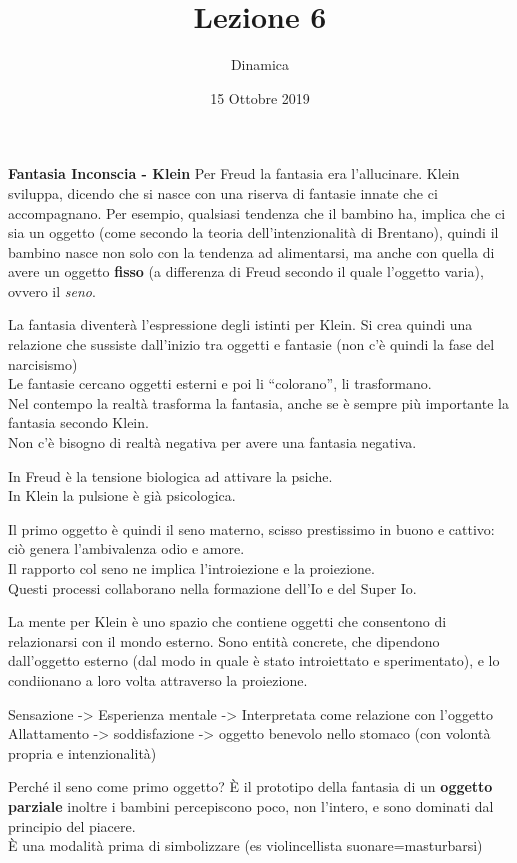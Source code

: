 \documentclass[
]{article}
\date{15 Ottobre 2019}
\title{Lezione 6}
\author{Dinamica}
\begin{document}
\maketitle

\textbf{Fantasia Inconscia - Klein} Per Freud la fantasia era
l'allucinare. Klein sviluppa, dicendo che si nasce con una riserva di
fantasie innate che ci accompagnano. Per esempio, qualsiasi tendenza che
il bambino ha, implica che ci sia un oggetto (come secondo la teoria
dell'intenzionalità di Brentano), quindi il bambino nasce non solo con
la tendenza ad alimentarsi, ma anche con quella di avere un oggetto
\textbf{fisso} (a differenza di Freud secondo il quale l'oggetto varia),
ovvero il \emph{seno}.

La fantasia diventerà l'espressione degli istinti per Klein. Si crea
quindi una relazione che sussiste dall'inizio tra oggetti e fantasie
(non c'è quindi la fase del narcisismo)\\
Le fantasie cercano oggetti esterni e poi li ``colorano'', li
trasformano.\\
Nel contempo la realtà trasforma la fantasia, anche se è sempre più
importante la fantasia secondo Klein.\\
Non c'è bisogno di realtà negativa per avere una fantasia negativa.

In Freud è la tensione biologica ad attivare la psiche.\\
In Klein la pulsione è già psicologica.

Il primo oggetto è quindi il seno materno, scisso prestissimo in buono e
cattivo: ciò genera l'ambivalenza odio e amore.\\
Il rapporto col seno ne implica l'introiezione e la proiezione.\\
Questi processi collaborano nella formazione dell'Io e del Super Io.

La mente per Klein è uno spazio che contiene oggetti che consentono di
relazionarsi con il mondo esterno. Sono entità concrete, che dipendono
dall'oggetto esterno (dal modo in quale è stato introiettato e
sperimentato), e lo condiionano a loro volta attraverso la proiezione.

Sensazione -\textgreater{} Esperienza mentale -\textgreater{}
Interpretata come relazione con l'oggetto\\
Allattamento -\textgreater{} soddisfazione -\textgreater{} oggetto
benevolo nello stomaco (con volontà propria e intenzionalità)

Perché il seno come primo oggetto? È il prototipo della fantasia di un
\textbf{oggetto parziale} inoltre i bambini percepiscono poco, non
l'intero, e sono dominati dal principio del piacere.\\
È una modalità prima di simbolizzare (es violincellista
suonare=masturbarsi)
\end{document}
